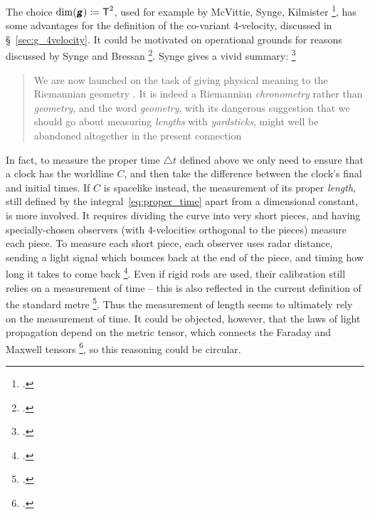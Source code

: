 \documentclass[\ifafour a4paper,12pt,\else a5paper,10pt,\fi%
onecolumn,oneside,article,%
british%
]{memoir}
\theoremstyle{remark}
\theoremstyle{innote}
\newcommand*{\mathte}[1]{\textbf{\textit{\textsf{#1}}}}
\newcommand*{\citep}{\footcites}
\newcommand*{\incr}{\triangle}%
\newcommand*{\defd}{\coloneqq}
\renewcommand*{\|}[1][]{\nonscript\,#1\vert\nonscript\;\mathopen{}}
\newcommand*{\sect}{\S}%
\newcommand*{\sects}{\S\S}%
\newcommand*{\chap}{ch.}%
\newcommand*{\Ti}{\textsf{T}}
\newcommand*{\yg}{\mathte{g}}
\newcommand*{\inct}{\incr t}
\begin{document}
The choice $\dim(\yg) \defd \Ti^{2}$, used for example by McVittie, Synge,
Kilmister
\citep[\sect~4.1]{mcvittie1956_r1965}[\sect~IV.5]{synge1960b}[\chap~II
p.~25]{kilmister1973}, has some advantages for the definition of the
co-variant 4-velocity, discussed in \sect~\ref{sec:g_4velocity}. It could
be motivated on operational grounds for reasons discussed by Synge and
Bressan \citep[\sects~III.2--4]{synge1960b}[\sects~15, 18]{bressan1978}.
Synge gives a vivid summary: \citep[\sect~III.3 pp.~108--109]{synge1960b}
\begin{quote}\footnotesize
  We are now launched on the task of giving physical meaning to the
  Riemannian geometry \textelp{}. It is indeed a Riemannian
  \emph{chronometry} rather than \emph{geometry}, and the word
  \emph{geometry}, with its dangerous suggestion that we should go about
  measuring \emph{lengths} with \emph{yardsticks}, might well be abandoned
  altogether in the present connection
\end{quote}
In fact, to measure the proper time $\inct$ defined above we only need to
ensure that a clock has the worldline $C$, and then take the difference
between the clock's final and initial times. %
If $C$ is spacelike instead, the measurement of its proper \emph{length},
still defined by the integral~\eqref{eq:proper_time} apart from a
dimensional constant, is more involved. It requires dividing the curve into
very short pieces, and having specially-chosen observers (with 4-velocities
orthogonal to the pieces) measure each piece. To measure each short piece,
each observer uses radar distance, sending a light signal which bounces
back at the end of the piece, and timing how long it takes to come back
\citep[\chap~2]{frankel1979}[\sect~84]{landauetal1939_t1996}. Even if rigid
rods are used, their calibration still relies on a measurement of time --
this is also reflected in the current definition of the standard metre
\citep[p.~98]{bipm1983}[p.~25]{giacomo1984}. Thus the measurement of length
seems to ultimately rely on the measurement of time. It could be objected,
however, that the laws of light propagation depend on the metric tensor,
which connects the Faraday and Maxwell tensors
\citep[\chap~F.III]{truesdelletal1960}[\chap~II.4]{misneretal1970_r1973}{puntigametal1997,hehletal2001,hehletal2004},
so this reasoning could be circular.

\medskip
\end{document}
